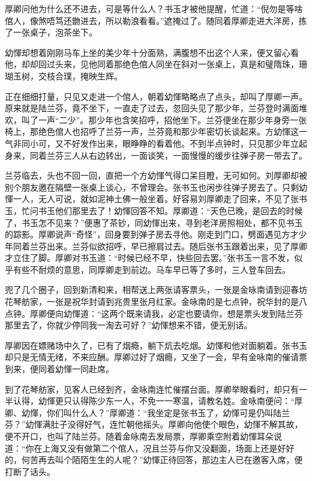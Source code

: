 \documentclass[12pt,UTF8]{ctexbook}
\begin{document}
{{{厚卿问他为什么还不进去，可是等什么人？书玉才被他提醒，忙道：“倪勿是等啥倌人，像煞唔笃还朆进去，所以勒浪看看。”遮掩过了。随同着厚卿走进大洋房，拣了一张桌子，泡茶坐下。

幼惲却想着刚刚马车上坐的美少年十分面熟，满腹想不出这个人来，便又留心看他，却却回过头来，见他同着那绝色倌人同坐在斜对一张桌上，真是和璧隋珠，珊瑚玉树，交枝合璞，掩映生辉。

正在细细打量，只见又走进一个倌人，朝着幼惲略略点了点头，却叫了厚卿一声。原来就是陆兰芬，竟不坐下，一直走了过去，忽回头见了那少年，兰芬登时满面堆欢，叫了一声“二少”。那少年也含笑招呼，招他坐下。兰芬便坐在那少年身旁一张椅上，那绝色倌人也招呼了兰芬一声，兰芬竟和那少年密切长谈起来。方幼惲这一气非同小可，又不好发作出来，眼睁睁的看着他。不到半点钟时，只见那少年立起身来，同着兰芬三人从右边转出，一面谈笑，一面慢慢的缓步往弹子房一带去了。

兰芬临去，头也不回一回，直把一个方幼惲气得口呆目瞪，无可如何。刘厚卿却被别个朋友邀在隔壁一张桌上谈心，不曾理会。张书玉也闲步往弹子房去了。只剩幼惲一人，无人可说，就如泥神土佛一般坐着。好容易刘厚卿走了回来，不见了张书玉，忙问书玉他们那里去了！幼惲回答不知。厚卿道：“天色已晚，是回去的时候了，书玉怎不见来？”便惠了茶钞，同幼惲出来，寻到老洋房照相处，都不见书玉的踪影。厚卿说声“奇怪”，回身要到弹子房去寻他。刚走到门口，劈面遇见方才少年同着兰芬出来。兰芬似欲招呼，早已擦肩过去。随后张书玉跟着出来，见了厚卿才立住了脚。厚卿对书玉道：“时候已经不早，快些回去罢。”张书玉一言不发，似乎有些不耐烦的意思，同厚卿走到前边。马车早已等了多时，三人登车回去。

兜了几个圈子，回到新清和来，相帮送上两张请客票头，一张是金咏南请到迎春坊花琴舫家，一张是祝华封请到兆贵里张月红家。金咏南的是七点钟，祝华封的是八点钟。厚卿便向幼惲道：“这两个既来请我，必定也要请你，想是票头发到陆兰芬那里去了，你就少停同我一淘去可好？”幼惲想来不错，便无别话。

厚卿因在嫖赌场中久了，已有了烟瘾，躺下炕去吃烟。幼惲和他对面躺着。张书玉却只是无情无绪，不来应酬。厚卿过好了烟瘾，又坐了一会，早有金咏南的催请票到来，便同着幼惲一同赴席。

到了花琴舫家，见客人已经到齐，金咏南连忙催摆台面。厚卿举眼看时，却只有一半认得，幼惲更只认得陈少东一人，不免一一寒温，请教名姓。金咏南便问：“厚卿、幼惲，你们叫什么人？”厚卿道：“我坐定是张书玉了，幼惲可是仍叫陆兰芬？”幼惲满肚子没得好气，连忙朝他摇头。厚卿向他使个眼色，幼惲不解其故，便不开口，也叫了陆兰芬。随着金咏南去发局票，厚卿乘空附着幼惲耳朵说道：“你在上海又没有做第二个倌人，况且兰芬与你又没翻面，场面上还是好好的，何苦再去叫个陌陌生生的人呢？”幼惲正待回答，那边主人已在邀客入席，便打断了话头。

}}}
\end{document}
